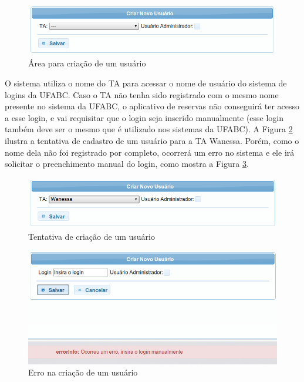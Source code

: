 \documentclass[openany,10pt,a4paper]{book}
\begin{document}
\begin{figure}[!htb]
    \centering
    \includegraphics[scale=0.5]{criarUsuario.png}
    \caption{Área para criação de um usuário}
    \label{criarUsuario}
\end{figure}

O sistema utiliza o nome do TA para acessar o nome de usuário do sistema de logins da UFABC. Caso o TA não tenha sido registrado com o mesmo nome presente no sistema da UFABC, o aplicativo de reservas não conseguirá ter acesso a esse login, e vai requisitar que o login seja inserido manualmente (esse login também deve ser o mesmo que é utilizado nos sistemas da UFABC). A Figura \ref{wanessa} ilustra a tentativa de cadastro de um usuário para a TA Wanessa. Porém, como o nome dela não foi registrado por completo, ocorrerá um erro no sistema e ele irá solicitar o preenchimento manual do login, como mostra a Figura \ref{erroUsuario}.

\begin{figure}[!htb]
    \centering
    \includegraphics[scale=0.5]{wanessa.png}
    \caption{Tentativa de criação de um usuário}
    \label{wanessa}
\end{figure}

\begin{figure}[!htb]
    \centering
    \includegraphics[scale=0.5]{erroUsuario.png}
    \caption{Erro na criação de um usuário}
    \label{erroUsuario}
\end{figure}
\end{document}
